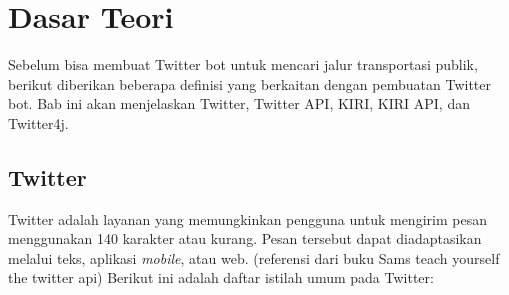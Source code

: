 \chapter{Dasar Teori}
\label{chap:dasar teori}

Sebelum bisa membuat Twitter bot untuk mencari jalur transportasi publik, berikut diberikan beberapa definisi yang berkaitan dengan pembuatan Twitter bot. Bab ini akan menjelaskan Twitter, Twitter API, KIRI, KIRI API, dan Twitter4j.

\section{Twitter}
\label{sec:twitter}

Twitter adalah layanan yang memungkinkan pengguna untuk mengirim pesan menggunakan 140 karakter atau kurang. Pesan tersebut dapat diadaptasikan melalui teks, aplikasi \textit{mobile}, atau web. (referensi dari buku Sams teach yourself the twitter api) Berikut ini adalah daftar istilah umum pada Twitter:

